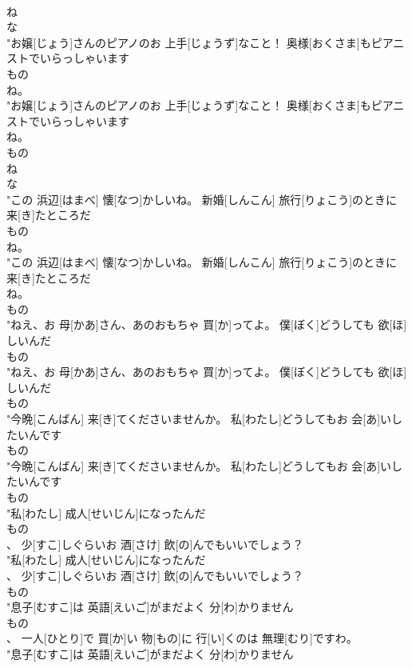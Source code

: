 \documentclass[8pt]{extreport}
\begin{document}
\begin{CJK}{UTF8}{min}
\\	ね 
\\	な 
\\	"お嬢[じょう]さんのピアノのお 上手[じょうず]なこと！ 奥様[おくさま]もピアニストでいらっしゃいます
\\	もの
\\	ね。
\\	"お嬢[じょう]さんのピアノのお 上手[じょうず]なこと！ 奥様[おくさま]もピアニストでいらっしゃいます
\\	ね。
\\	もの
\\	ね 
\\	な 
\\	"この 浜辺[はまべ] 懐[なつ]かしいね。 新婚[しんこん] 旅行[りょこう]のときに 来[き]たところだ
\\	もの
\\	ね。
\\	"この 浜辺[はまべ] 懐[なつ]かしいね。 新婚[しんこん] 旅行[りょこう]のときに 来[き]たところだ
\\	ね。
\\	もの
\\	"ねえ、お 母[かあ]さん、あのおもちゃ 買[か]ってよ。 僕[ぼく]どうしても 欲[ほ]しいんだ
\\	もの
\\	"ねえ、お 母[かあ]さん、あのおもちゃ 買[か]ってよ。 僕[ぼく]どうしても 欲[ほ]しいんだ
\\	もの
\\	"今晩[こんばん] 来[き]てくださいませんか。 私[わたし]どうしてもお 会[あ]いしたいんです
\\	もの
\\	"今晩[こんばん] 来[き]てくださいませんか。 私[わたし]どうしてもお 会[あ]いしたいんです
\\	もの
\\	"私[わたし] 成人[せいじん]になったんだ
\\	もの
\\	、 少[すこ]しぐらいお 酒[さけ] 飲[の]んでもいいでしょう？
\\	"私[わたし] 成人[せいじん]になったんだ
\\	、 少[すこ]しぐらいお 酒[さけ] 飲[の]んでもいいでしょう？
\\	もの
\\	"息子[むすこ]は 英語[えいご]がまだよく 分[わ]かりません
\\	もの
\\	、 一人[ひとり]で 買[か]い 物[もの]に 行[い]くのは 無理[むり]ですわ。
\\	"息子[むすこ]は 英語[えいご]がまだよく 分[わ]かりません

\end{CJK}
\end{document}
